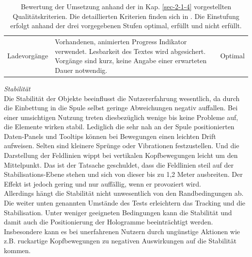 \begin{landscape}
\begin{table}
\begin{tabular}{m{2.3cm}|m{15.5cm}|m{2cm}}
			\hline
			Ladevorgänge & Vorhandenen, animierten Progress Indikator verwendet. Lesbarkeit des Textes wird abgesichert. Vorgänge sind kurz, keine Angabe einer erwarteten Dauer notwendig. & Optimal\\
		\end{tabular}\caption{\label{tab:tech_results} Bewertung der Umsetzung anhand der in Kap. \ref{sec-2-1-4} vorgestellten Qualitätskriterien. Die detaillierten Kriterien finden sich in \cite{MRDoc}. Die Einstufung erfolgt anhand der drei vorgegebenen Stufen optimal, erfüllt und nicht erfüllt.}
	\end{table}
	\egroup
\end{landscape}

\textit{Stabilität}\\
Die Stabilität der Objekte beeinflusst die Nutzererfahrung wesentlich, da durch die Einbettung in die Spule selbst geringe Abweichungen negativ auffallen. Bei einer umsichtigen Nutzung treten diesbezüglich wenige bis keine Probleme auf, die Elemente wirken stabil. Lediglich die sehr nah an der Spule positionierten Daten-Panels und Tooltips können bei Bewegungen einen leichten Drift aufweisen. Selten sind kleinere Sprünge oder Vibrationen festzustellen. Und die Darstellung der Feldlinien wippt bei vertikalen Kopfbewegungen leicht um den Mittelpunkt. Das ist der Tatsache geschuldet, dass die Feldlinien steil auf der Stabilisations-Ebene stehen und sich von dieser bis zu 1,2 Meter ausbreiten. Der Effekt ist jedoch gering und nur auffällig, wenn er provoziert wird.\\

Allerdings hängt die Stabilität nicht unwesentlich von den Randbedingungen ab. Die weiter unten genannten Umstände des Tests erleichtern das Tracking und die Stabilisation. Unter weniger geeigneten Bedingungen kann die Stabilität und damit auch die Positionierung der Hologramme beeinträchtigt werden. Insbesondere kann es bei unerfahrenen Nutzern durch ungünstige Aktionen wie z.B. ruckartige Kopfbewegungen zu negativen Auswirkungen auf die Stabilität kommen.\\

